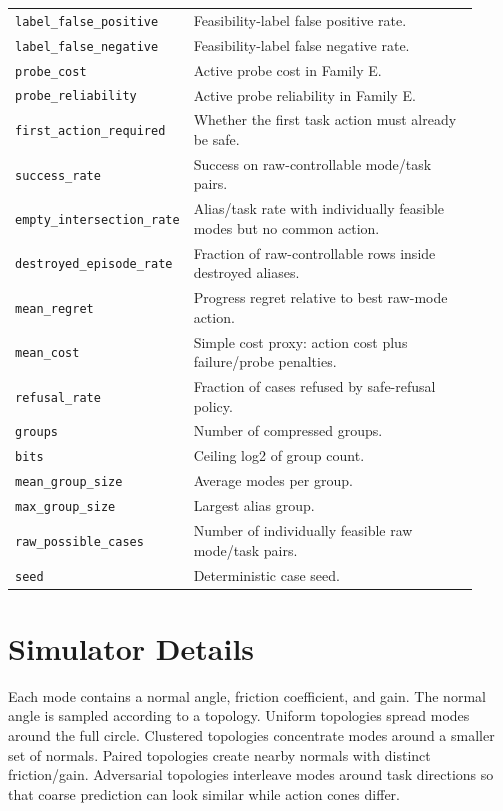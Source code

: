 \documentclass{article}
\begin{document}
\begin{table}[p]
\begin{tabular}{p{0.25\linewidth}p{0.67\linewidth}}
\texttt{label\_false\_positive} & Feasibility-label false positive rate.\\
\texttt{label\_false\_negative} & Feasibility-label false negative rate.\\
\texttt{probe\_cost} & Active probe cost in Family E.\\
\texttt{probe\_reliability} & Active probe reliability in Family E.\\
\texttt{first\_action\_required} & Whether the first task action must already be safe.\\
\texttt{success\_rate} & Success on raw-controllable mode/task pairs.\\
\texttt{empty\_intersection\_rate} & Alias/task rate with individually feasible modes but no common action.\\
\texttt{destroyed\_episode\_rate} & Fraction of raw-controllable rows inside destroyed aliases.\\
\texttt{mean\_regret} & Progress regret relative to best raw-mode action.\\
\texttt{mean\_cost} & Simple cost proxy: action cost plus failure/probe penalties.\\
\texttt{refusal\_rate} & Fraction of cases refused by safe-refusal policy.\\
\texttt{groups} & Number of compressed groups.\\
\texttt{bits} & Ceiling log2 of group count.\\
\texttt{mean\_group\_size} & Average modes per group.\\
\texttt{max\_group\_size} & Largest alias group.\\
\texttt{raw\_possible\_cases} & Number of individually feasible raw mode/task pairs.\\
\texttt{seed} & Deterministic case seed.\\
\bottomrule
\end{tabular}
\end{table}

\section{Simulator Details}
Each mode contains a normal angle, friction coefficient, and gain. The normal angle is sampled according to a topology. Uniform topologies spread modes around the full circle. Clustered topologies concentrate modes around a smaller set of normals. Paired topologies create nearby normals with distinct friction/gain. Adversarial topologies interleave modes around task directions so that coarse prediction can look similar while action cones differ.
\end{document}
